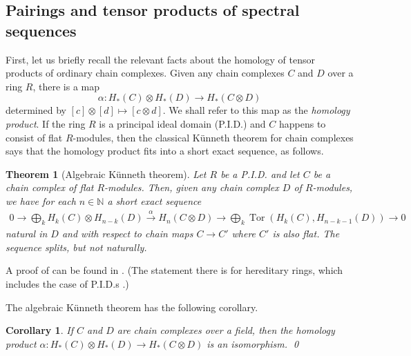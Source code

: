 \documentclass[a4paper, 11 pt, oneside, reqno]{amsart}
\numberwithin{lemma}{section}
\newtheorem{theorem}[lemma]{Theorem}
\newtheorem{corollary}[lemma]{Corollary}
\theoremstyle{definition}
\newcommand{\demph}[1]{\emph{#1}}
\newcommand{\xto}{\xrightarrow}
\DeclareMathOperator{\tor}{Tor}
\begin{document}
\subsection{Pairings and tensor products of spectral sequences}

First, let us briefly recall the relevant facts about the homology of tensor products of ordinary chain complexes. Given any chain complexes \(C\) and \(D\) over a ring \(R\), there is a map
\begin{equation}
\label{eq:homology_prod}
    \alpha\colon H_\ast(C) \otimes H_\ast(D) \to H_\ast(C \otimes D)
\end{equation}
determined by \([c] \otimes [d] \mapsto [c \otimes d]\). We shall refer to this map as the \demph{homology product}. If the ring \(R\) is a principal ideal domain (P.I.D.) and \(C\) happens to consist of flat \(R\)-modules, then the classical K\"unneth theorem for chain complexes says that the homology product fits into a short exact sequence, as follows.

\begin{theorem}[Algebraic K\"unneth theorem]
\label{thm:alg_kunneth}
    Let \(R\) be a P.I.D. and let \(C\) be a chain complex of flat \(R\)-modules. Then, given any chain complex \(D\) of \(R\)-modules, we have for each \(n \in \mathbb{N}\) a short exact sequence
    \begin{align*}
        0 \to \bigoplus_k H_k(C) \otimes H_{n-k}(D) \xto{\alpha} H_n(C \otimes D) \to \bigoplus_k \tor(H_k(C), H_{n-k-1}(D)) \to 0
    \end{align*}
    natural in \(D\) and with respect to chain maps \(C \to C'\) where \(C'\) is also flat. The sequence splits, but not naturally.
\end{theorem}

A proof of  can be found in \cite[VI.3.3]{CartanEilenberg}. (The statement there is for hereditary rings, which includes the case of P.I.D.s \cite[p.13]{CartanEilenberg}.)

The algebraic K\"unneth theorem has the following corollary.

\begin{corollary}
\label{cor:alg_kunneth}
    If \(C\) and \(D\) are chain complexes over a field, then the homology product \(\alpha\colon H_\ast(C) \otimes H_\ast(D) \to H_\ast(C \otimes D)\) is an isomorphism. \qed
\end{corollary}
\end{document}
